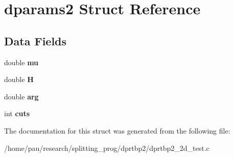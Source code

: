 \hypertarget{structdparams2}{
\section{dparams2 Struct Reference}
\label{structdparams2}
}
\subsection*{Data Fields}
\begin{DoxyCompactItemize}
\item 
\hypertarget{structdparams2_a74577585cf12d1712ab9c57616d49205}{
double {\bfseries mu}}
\label{structdparams2_a74577585cf12d1712ab9c57616d49205}

\item 
\hypertarget{structdparams2_a982cf43f120ff8978010e078bd49d9a3}{
double {\bfseries H}}
\label{structdparams2_a982cf43f120ff8978010e078bd49d9a3}

\item 
\hypertarget{structdparams2_aef0000238b70c60b2c49fda1cce93f14}{
double {\bfseries arg}}
\label{structdparams2_aef0000238b70c60b2c49fda1cce93f14}

\item 
\hypertarget{structdparams2_ae2a1c7717335e868b50d2cb44d017589}{
int {\bfseries cuts}}
\label{structdparams2_ae2a1c7717335e868b50d2cb44d017589}

\end{DoxyCompactItemize}


The documentation for this struct was generated from the following file:\begin{DoxyCompactItemize}
\item 
/home/pau/research/splitting\_\-prog/dprtbp2/dprtbp2\_\-2d\_\-test.c\end{DoxyCompactItemize}
